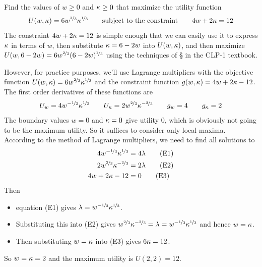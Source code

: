 \begin{eg}\label{eg LagrangeD}
Find the values of $w\ge0$ and $\kappa\ge0$ that maximize the utility
function 
\begin{equation*}
U(w,\kappa) =6 w^{\nicefrac{2}{3}}\kappa^{\nicefrac{1}{3}}
 \qquad\text{subject to the constraint}\qquad
4w+2\kappa=12
\end{equation*}
\soln 
The constraint $4w+2\kappa=12$ is simple enough that we can 
easily use it to express $\kappa$ in terms of $w$,
then substitute $\kappa=6-2w$ into  $U(w,\kappa)$, and then 
maximize 
$U(w,6-2w) = 6 w^{\nicefrac{2}{3}}(6-2w)^{\nicefrac{1}{3}}$ 
using the techniques of \S{} in 
the CLP-1 textbook.

However, for practice purposes, we'll use Lagrange multipliers
with the objective function 
$U(w,\kappa) =6 w^{\nicefrac{2}{3}}\kappa^{\nicefrac{1}{3}}$
and the constraint function $g(w,\kappa)=4w+2\kappa-12$. 
The first order derivatives of these functions are
\begin{equation*}
U_w=4w^{-\nicefrac{1}{3}}\kappa^{\nicefrac{1}{3}}\qquad
U_\kappa=2w^{\nicefrac{2}{3}}\kappa^{-\nicefrac{2}{3}}\qquad
g_w=4\qquad
g_\kappa=2
\end{equation*}
The boundary values $w=0$ and $\kappa=0$ give utility $0$, which 
is obviously not going to be the maximum utility. So it suffices to
consider only local maxima. 
According to the method of Lagrange multipliers, we need to find 
all solutions to
\begin{alignat*}{5}
4w^{-\nicefrac{1}{3}}\kappa^{\nicefrac{1}{3}}&=4\lambda  \tag{E1}\\
2w^{\nicefrac{2}{3}}\kappa^{-\nicefrac{2}{3}}&=2\lambda  \tag{E2}\\
4w+2\kappa-12&=0 \tag{E3}
\end{alignat*}
Then
\begin{itemize}
\item equation (E1) gives $\lambda=w^{-\nicefrac{1}{3}}\kappa^{\nicefrac{1}{3}}$.
\item Substituting this into (E2) gives
    $w^{\nicefrac{2}{3}}\kappa^{-\nicefrac{2}{3}}=\lambda 
   =w^{-\nicefrac{1}{3}}\kappa^{\nicefrac{1}{3}}$
and hence  $w=\kappa$.
\item Then substituting $w=\kappa$ into
(E3) gives $6\kappa=12$. 
\end{itemize}
So $w=\kappa=2$ and the maximum utility is $U(2,2)=12$.

\end{eg}


